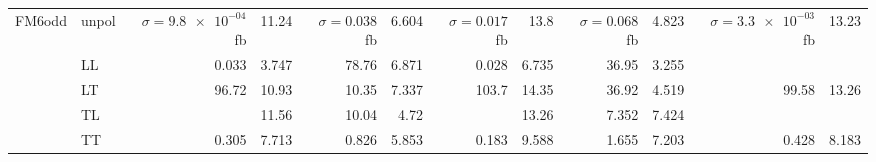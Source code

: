 \begin{table}[h]
{\begin{tabular}{llrrrrrrrrrr}
\midrule
\multirow{5}{*}{FM6odd}
 & unpol & $\sigma = \num{9.8e-04}$ fb & \num{11.24} & $\sigma = \num{0.038}$ fb & \num{6.604} & $\sigma = \num{0.017}$ fb & \num{13.8} & $\sigma = \num{0.068}$ fb & \num{4.823} & $\sigma = \num{3.3e-03}$ fb & \num{13.23} \\
 & LL & \num{0.033} & \num{3.747} & \num{78.76} & \num{6.871} & \num{0.028} & \num{6.735} & \num{36.95} & \num{3.255} &  &  \\
 & LT & \num{96.72} & \num{10.93} & \num{10.35} & \num{7.337} & \num{103.7} & \num{14.35} & \num{36.92} & \num{4.519} & \num{99.58} & \num{13.26} \\
 & TL &  & \num{11.56} & \num{10.04} & \num{4.72} &  & \num{13.26} & \num{7.352} & \num{7.424} &  &  \\
 & TT & \num{0.305} & \num{7.713} & \num{0.826} & \num{5.853} & \num{0.183} & \num{9.588} & \num{1.655} & \num{7.203} & \num{0.428} & \num{8.183} \\
\bottomrule
\end{tabular}
}%
\end{table}
\newpage
